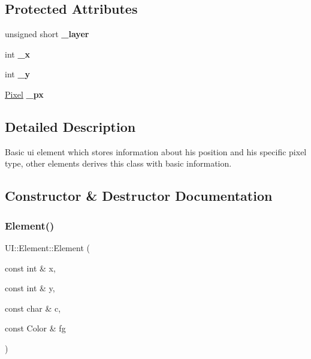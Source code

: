 \subsection*{Protected Attributes}
\begin{DoxyCompactItemize}
\item 
\mbox{\label{classUI_1_1Element_a2d9fcb40e69bc79e794bcf9b7e344e76}} 
unsigned short {\bfseries \+\_\+layer}
\item 
\mbox{\label{classUI_1_1Element_a739b285a4985732f1a051eb5e082809d}} 
int {\bfseries \+\_\+x}
\item 
\mbox{\label{classUI_1_1Element_ac94edbdb6eba934fb6e9ca61dfa6a485}} 
int {\bfseries \+\_\+y}
\item 
\mbox{\label{classUI_1_1Element_a993e5216a981cb70310236536609cafc}} 
\hyperlink{classUI_1_1Pixel}{Pixel} {\bfseries \+\_\+px}
\end{DoxyCompactItemize}


\subsection{Detailed Description}
Basic ui element which stores information about his position and his specific pixel type, other elements derives this class with basic information. 

\subsection{Constructor \& Destructor Documentation}
\mbox{\label{classUI_1_1Element_ad8748432459e26a90db62d2ded032fae}} 
\subsubsection{\texorpdfstring{Element()}{Element()}}
{\footnotesize\ttfamily U\+I\+::\+Element\+::\+Element (\begin{DoxyParamCaption}\item[{const int \&}]{x,  }\item[{const int \&}]{y,  }\item[{const char \&}]{c,  }\item[{const Color \&}]{fg }\end{DoxyParamCaption})}



